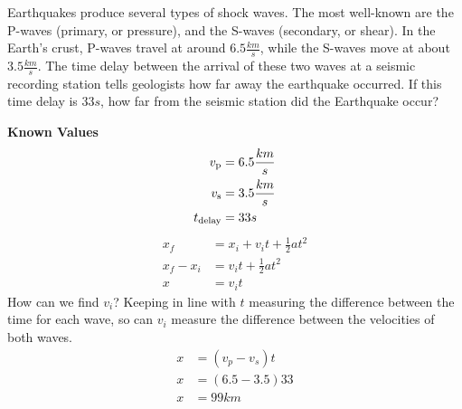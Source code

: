 \documentclass[12pt, letterpaper]{article}
\begin{document}
\begin{example}
  Earthquakes produce several types of shock waves. The most well-known are the P-waves 
  (primary, or pressure), and the S-waves (secondary, or shear). In the Earth’s crust, 
  P-waves travel at around $6.5 \frac{km}{s}$, while the S-waves move at about $3.5 \frac{km}{s}$. The time
  delay between the arrival of these two waves at a seismic recording station tells 
  geologists how far away the earthquake occurred. If this time delay is $33 s$, how far
  from the seismic station did the Earthquake occur?

  \vspace{110pt}
  \hspace{-75pt}
  \begin{tikzpicture}
    
  \end{tikzpicture}
  \vspace{-75pt}

  \begin{tcolorbox}[
    standard jigsaw, %
    colframe=fg,
    boxrule=0px,
    opacityback=0,
    sidebyside,
    lefthand width=100px,
    coltext=fg,
  ]
  \textbf{Known Values}
  \begin{align*}
    v_{\textup{p}}     &= 6.5 \frac{km}{s} \\
    v_{\textup{s}}     &= 3.5 \frac{km}{s} \\
    t_{\textup{delay}} &= 33 s
  \end{align*}
  \tcblower
  \begin{align*}
    x_f       &= x_i + v_it + \frac{1}{2}at^2 \\
    x_f - x_i &= v_it + \frac{1}{2}at^2 \\ 
    x         &= v_it
  \end{align*}
  How can we find $v_i$? Keeping in line with $t$ measuring the difference between the time for each wave, so can $v_i$ measure the difference between the velocities of both waves.
  \begin{align*}
    x &= (v_p-v_s)t  \\
    x &= (6.5-3.5)33 \\
    x &= 99km
  \end{align*}
  \end{tcolorbox}
\end{example}
\end{document}
